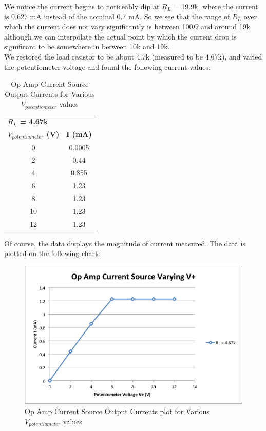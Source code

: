 \documentclass{article}
\begin{document}
    We notice the current begins to noticeably dip at $R_L$ = 19.9k, where the current is 0.627 mA instead of the nominal 0.7 mA. So we see that the range of $R_L$ over which the current does not vary significantly is between 100$\Omega$ and around 19k although we can interpolate the actual point by which the current drop is significant to be somewhere in between 10k and 19k.\\\indent We restored the load resistor to be about 4.7k (measured to be 4.67k), and varied the potentiometer voltage and found the following current values:
    \begin{table}[H]
        \centering
        \caption{Op Amp Current Source Output Currents for Various $V_{potentiometer}$ values}
        \label{my-label}
        \begin{tabular}{cc}
        \multicolumn{1}{l}{\textbf{$R_L$ = 4.67k}} & \multicolumn{1}{l}{\textbf{}} \\
        \textbf{$V_{potentiometer}$ (V)} & \textbf{I (mA)} \\ \hline
        0 & 0.0005 \\
        2 & 0.44 \\
        4 & 0.855 \\
        6 & 1.23 \\
        8 & 1.23 \\
        10 & 1.23 \\
        12 & 1.23
        \end{tabular}
    \end{table}
    Of course, the data displays the magnitude of current measured. The data is plotted on the following chart:
    \begin{figure}[H]
        \centering
        \includegraphics[scale = 0.5]{12a.png}
        \caption{Op Amp Current Source Output Currents plot for Various $V_{potentiometer}$ values}
        \label{fig:my_label}
    \end{figure}
\end{document}
